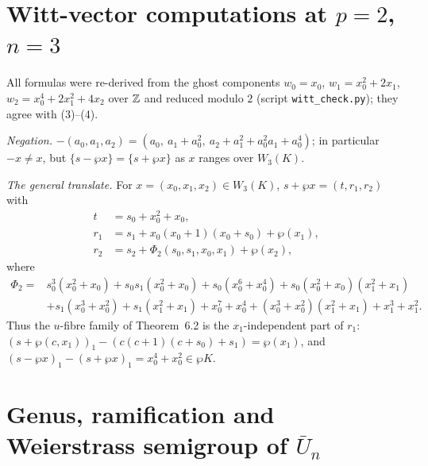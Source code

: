 \appendix

\section{Witt-vector computations at \texorpdfstring{$p=2$, $n=3$}{p=2, n=3}}\label{app:witt}

All formulas were re-derived from the ghost components $w_0=x_0$, $w_1=x_0^2+2x_1$,
$w_2=x_0^4+2x_1^2+4x_2$ over $\mathbb Z$ and reduced modulo $2$ (script \texttt{witt\_check.py});
they agree with (3)--(4). 

\emph{Negation.} $-(a_0,a_1,a_2)=(a_0,\ a_1+a_0^2,\ a_2+a_1^2+a_0^2a_1+a_0^4)$; in
particular $-x\ne x$, but $\{s-\wp x\}=\{s+\wp x\}$ as $x$ ranges over $W_3(K)$.

\emph{The general translate.} For $x=(x_0,x_1,x_2)\in W_3(K)$,
$s+\wp x=(t,r_1,r_2)$ with
\begin{align*}
t&=s_0+x_0^2+x_0,\\
r_1&=s_1+x_0(x_0+1)(x_0+s_0)+\wp(x_1),\\
r_2&=s_2+\Phi_2(s_0,s_1,x_0,x_1)+\wp(x_2),
\end{align*}
where
\begin{equation}\label{eq:Phi2}
\begin{aligned}
\Phi_2={}&s_0^3(x_0^2+x_0)+s_0s_1(x_0^2+x_0)+s_0(x_0^6+x_0^4)+s_0(x_0^2+x_0)(x_1^2+x_1)\\
&+s_1(x_0^3+x_0^2)+s_1(x_1^2+x_1)+x_0^7+x_0^4+(x_0^3+x_0^2)(x_1^2+x_1)+x_1^3+x_1^2 .
\end{aligned}
\end{equation}
Thus the $u$-fibre family of Theorem~6.2 is the $x_1$-independent part of $r_1$:
$(s+\wp(c,x_1))_1-(c(c+1)(c+s_0)+s_1)=\wp(x_1)$, and
$(s-\wp x)_1-(s+\wp x)_1=x_0^4+x_0^2\in\wp K$.

\section{Genus, ramification and Weierstrass semigroup of \texorpdfstring{$\bar U_n$}{U\_n}}
\label{app:genus}

